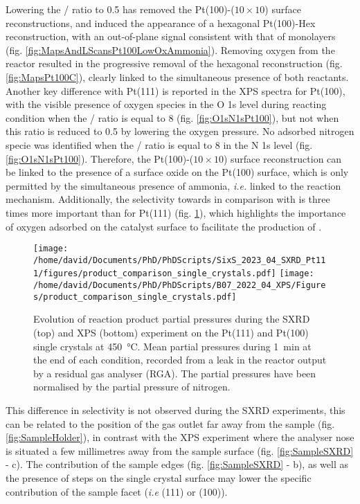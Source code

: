 Lowering the / ratio to \num{0.5} has removed the Pt(100)-($10\times10$) surface reconstructions, and induced the appearance of a hexagonal Pt(100)-Hex reconstruction, with an out-of-plane signal consistent with that of monolayers (fig. \ref{fig:MapsAndLScansPt100LowOxAmmonia}).
Removing oxygen from the reactor resulted in the progressive removal of the hexagonal reconstruction (fig. \ref{fig:MapsPt100C}), clearly linked to the simultaneous presence of both reactants.
Another key difference with Pt(111) is reported in the XPS spectra for Pt(100), with the visible presence of oxygen species in the O 1s level during reacting condition when the / ratio is equal to \num{8} (fig. \ref{fig:O1sN1sPt100}), but not when this ratio is reduced to \num{0.5} by lowering the oxygen pressure.
No adsorbed nitrogen specie was identified when the / ratio is equal to \num{8} in the N 1s level  (fig. \ref{fig:O1sN1sPt100}).
Therefore, the Pt(100)-($10\times10$) surface reconstruction can be linked to the presence of a surface oxide on the Pt(100) surface, which is only permitted by the simultaneous presence of ammonia, \textit{i.e.} linked to the reaction mechanism.
Additionally, the selectivity towards  in comparison with  is three times more important than for Pt(111) (fig. \ref{fig:RGA450Pt111AndPt100}), which highlights the importance of oxygen adsorbed on the catalyst surface to facilitate the production of .

\begin{figure}[!htb]
    \centering
    \texttt{[image: /home/david/Documents/PhD/PhDScripts/SixS\_2023\_04\_SXRD\_Pt111/figures/product\_comparison\_single\_crystals.pdf]}
    \texttt{[image: /home/david/Documents/PhD/PhDScripts/B07\_2022\_04\_XPS/Figures/product\_comparison\_single\_crystals.pdf]}
    \caption{
        Evolution of reaction product partial pressures during the SXRD (top) and XPS (bottom) experiment on the Pt(111) and Pt(100) single crystals at \qty{450}{\degreeCelsius}.
        Mean partial pressures during \qty{1}{\minute} at the end of each condition, recorded from a leak in the reactor output by a residual gas analyser (RGA).
        The partial pressures have been normalised by the partial pressure of nitrogen.
    }
    \label{fig:RGA450Pt111AndPt100}
\end{figure}

This difference in selectivity is not observed during the SXRD experiments, this can be related to the position of the gas outlet far away from the sample (fig. \ref{fig:SampleHolder}), in contrast with the XPS experiment where the analyser nose is situated a few millimetres away from the sample surface (fig. \ref{fig:SampleSXRD} - c).
The contribution of the sample edges (fig. \ref{fig:SampleSXRD} - b), as well as the presence of steps on the single crystal surface may lower the specific contribution of the sample facet (\textit{i.e} (111) or (100)).

